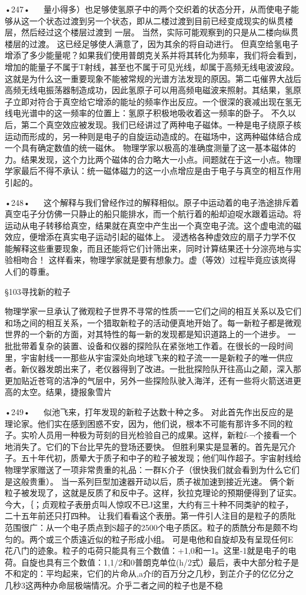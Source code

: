 •247•
  
量小得多）也足够使氢原子中的两个交织着的状态分开，从而使电子能够从这一个状态过渡到另一个状态，即从二楼过渡到目前已经变成现实的纵贯楼层，然后经过这个楼层过渡到
一层。
当然，实际可能观察到的只是从二楼向纵贯楼层的过渡。
这已经足够使人满意了，因为其余的将自动进行。
但真空给氢电子增添了多少能量呢？如果我们使用普朗克关系并将其转化为频率，我们将会看到，增加的能量子不属于T射线，甚至也不属于可见光线，却属于高频无线电波波段。
这就是为什么这一重要现象不能被常规的光谱方法发现的原因。第二屯催界大战后高频无线电振荡器制造成功，因此氢原子可以用高频电磁波来照射。其结果，氢原子立即对符合于真空给它增添的能址的频率作出反应。一个很深的衰减出现在氢无线电光谱中的这一频率的位置上：氢原子积极地吸收着这一频率的卧子。
不久以后，第二个真空效应被发现。我们已经讲过了两种电子磁体。一种是电子绕原子核运动而形成的，另一种则是电子的自旋运动造成的。在磁场中，这两种磁体结合成一个具有确定数值的统一磁休。
物理学家以极高的准确度测量了这一基本磁体的力。结果发现，这个力比两个磁体的合力略大一小点。间题就在于这一小点。物理学家最后不得不承认：统一磁体磁力的这一小点增应是由于电子与真空的相互作用引起的。

•248•
  
这个解释与我们曾经作过的解释相似。原子中运动着的电子浩途排斥着真空屯子分仿佛一只静止的船只能排水，而一个航行着的船却迫哫水跟着运动。将运动从电子转移给真空，结果就在真空中产生出一个真空电子流。这个虚电流的磁效应，便增添在真实电子运动引起的磁体上。
浸透格各种虚效应的扇子力学不仅能解释这些重要现象，而且还能将它们计筛出来，同时计算结果还十分淙亮地与实验相吻合！
这样看来，物理学家就是要有想象力。虚（等效）过程毕竟应该岚得人们的尊重。

§103寻找新的粒子

物理学家一旦承认了微观粒子世界不寻常的性质一一它们之间的相互关系以及它们和场之间的相互关系，一个猎取新粒子的活动便真地开始了。每一新粒子都是微观世界的一个新的方面，对其特性的每一新的发现都是知识道路上的一个进步。
一批批带着复杂的装置、设备和仪器的探险队在紧张地工作着。在很长的一段时间里，宇宙射线一一那些从宇宙深处向地球飞来的粒子流一一是新粒子的唯一供应者。新仪器发朗出来了，老仪器得到了改进。一批批探险队开往高山之颠，深入那更加贴近苍穹的洁净的气层中，另外一些探险队驶入海洋，还有一些将火箭送进更高的太空。结果，捷报象雪片

•249•
  
似池飞来，打年发现的新粒子达数十种之多。
对此首先作出反应的是理论家。他们实在感到困惑不安，因为，他们说，根本不可能有那许多不同的粒子。实吤人员用一种极为苛刻的目光检验自己的成果。这样，新粒f-¬个接看一个地消失了。它们的下台比早先的登场还要快。
但胜利果实是显著的。首先是冗介子。五十年代初，质晕大于质子和中子的粒子被发现；他们叫作超子。宇宙射线给物理学家赠送了一项非常贵重的礼品：一群K介子（很快我们就会看到为什么它们是这般贵重）。
当一系列巨型加速器开动以后，质子袚加速到接近光速。
俩个新粒子被发现了，这就是反质了和反中子。这样，狄拉克理论的预期便得到了证实。
今大，｛；贞观粒子表册贞叫人惊叹不已J这里，大约有三十种不同类驴的粒子，二十五年前还只打四种。
让我们看看这个表册。第一件引人注目的是粒子的质阰范围很广：从一个电子质点到S超子的2500个电子质区。粒子的质酰分布是颇不均匀的。两个或三个质遠近似的粒子形成小组。
可是电他和自旋却及有呈现任何E花八门的迹象。粒子的屯荷只能具有三个数值：+1,0和一1。这里-1就是电子的电荷。自旋也具有三个数值：1,1/2和0普朗克单位(h/2式）最后，表中大部分粒子是不和定的：平均起来，它们的片命从,a介f的百万分之几秒，到芷介子的亿亿分之几秒3这两种办命屈极端情况。介乎二者之间的粒子也是不稳

